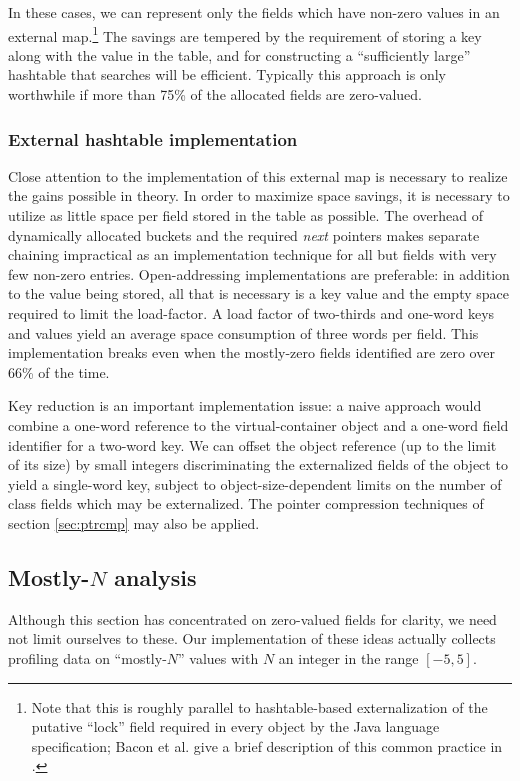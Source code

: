 \documentclass[preprint]{acmconf}
\begin{document}
In these cases, we can represent only the fields which have non-zero
values in an external map.\footnote{Note that this is roughly parallel
  to hashtable-based externalization of the putative ``lock'' field
  required in every object by the Java language specification; Bacon
  et al. give a brief description of this common
  practice in \cite{bacon98}.}
The savings are tempered by the requirement of storing a key along
with the value in the table, and for constructing a ``sufficiently
large'' hashtable that searches will be efficient.  Typically this
approach is only worthwhile if more than 75\% of the allocated fields
are zero-valued.

\subsubsection{External hashtable implementation}
Close attention to the implementation of this external map is
necessary to realize the gains possible in theory.  In order to
maximize space savings, it is necessary to utilize as little space
per field stored in the table as possible.  The overhead of
dynamically allocated buckets and the required {\it next} pointers
makes separate chaining impractical as an implementation technique
for all but fields with very few non-zero entries.  Open-addressing
implementations are preferable: in addition to the value being stored,
all that is necessary is a key value and the empty space required to
limit the load-factor.  A load factor of two-thirds and one-word keys
and values yield an average space consumption of three words per
field.  This implementation breaks even when the mostly-zero fields
identified are zero over 66\% of the time.

Key reduction is an important implementation issue: a naive approach
would combine a one-word reference to the virtual-container object and a
one-word field identifier for a two-word key.  We can offset the
object reference (up to the limit of its size) by small integers
discriminating the externalized fields of the object to yield a
single-word key, subject to object-size-dependent limits on the number
of class fields which may be externalized.  The pointer compression
techniques of section \ref{sec:ptrcmp} may also be applied.

\subsection{Mostly-$N$ analysis}
Although this section has concentrated on zero-valued fields for
clarity, we need not limit ourselves to these.  Our implementation of
these ideas actually collects profiling data on ``mostly-$N$'' values
with $N$ an integer in the range $[-5,5]$.
\end{document}
